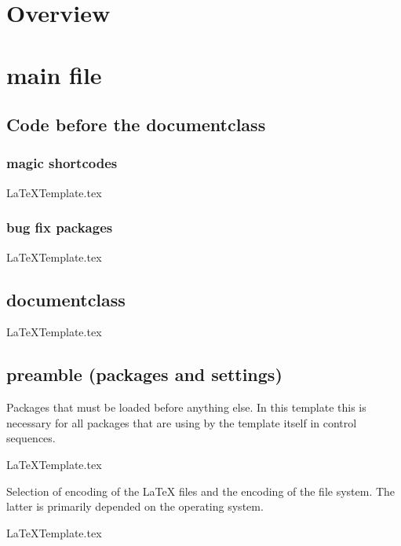 \setcounter{lstLastLine}{0}
\setcounter{lstLastPage}{0}
\newcommand{\printCodeFromFile}[3][]
{
\ifstrempty{#1}{}{%
  \setcounter{lstLastPage}{#1}
}
\setcounter{lstLastLine}{#2}
%
%
  {#3}%
%
\setcounter{lstLastPage}{#2}
\addtocounter{lstLastPage}{1}
}

\chapter{Overview}

\chapter{main file}

\section{Code before the documentclass}
\subsection{magic shortcodes}
\printCodeFromFile{1}{LaTeXTemplate.tex}

\subsection{bug fix packages}
\printCodeFromFile[3]{6}{LaTeXTemplate.tex}

\section{documentclass}
\printCodeFromFile{22}{LaTeXTemplate.tex}

\section{preamble (packages and settings)}
Packages that must be loaded before anything else. In this template this is necessary for all packages that are using by the template itself in control sequences.
\printCodeFromFile[27]{29}{LaTeXTemplate.tex}

Selection of encoding of the LaTeX files and the encoding of the file system. The latter is primarily depended on the operating system.
\printCodeFromFile[35]{46}{LaTeXTemplate.tex}

